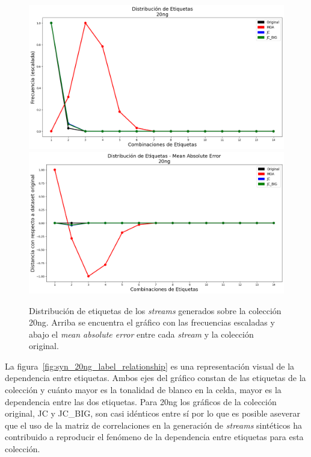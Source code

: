 \begin{figure}[htbp]
	\includegraphics[width=\linewidth]{figures/experiments/syn/20ng/label_distribution.png}
	\includegraphics[width=\linewidth]{figures/experiments/syn/20ng/ld_mae.png}
	\caption[Distribución de etiquetas de los \textit{streams} generados sobre la colección
		20ng.]{Distribución de etiquetas de los \textit{streams} generados sobre la colección
		20ng. Arriba se encuentra el gráfico con las frecuencias escaladas y
		abajo el \textit{mean absolute error} entre cada \textit{stream} y la
		colección original.}
	\label{fig:syn_20ng_label_distribution}
\end{figure}

La figura~\ref{fig:syn_20ng_label_relationship} es una representación visual de
la dependencia entre etiquetas. Ambos ejes del gráfico constan de las etiquetas
de la colección y cuánto mayor es la tonalidad de blanco en la celda, mayor es
la dependencia entre las dos etiquetas. Para 20ng los gráficos de la colección
original, JC y JC\_BIG, son casi idénticos entre sí por lo que es posible
aseverar que el uso de la matriz de correlaciones en la generación de
\textit{streams} sintéticos ha contribuido a reproducir el fenómeno de la
dependencia entre etiquetas para esta colección.

